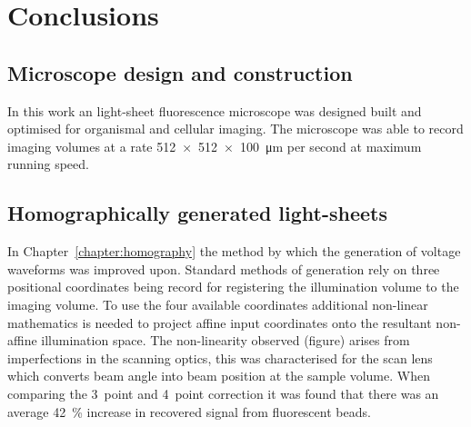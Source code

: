 \ifpdf
    \graphicspath{{Chapters/conclusions/Figs/Raster/}{Chapters/conclusions/Figs/PDF/}{Chapters/conclusions/Figs/}}
\else
    \graphicspath{{Chapters/conclusions/Figs/Vector/}{Chapters/conclusions/Figs/}}
\fi

\chapter{Conclusions}\label{chapter:conclusions}


\section{Microscope design and construction}
In this work an \gls{light-sheet} fluorescence microscope was designed built and optimised for organismal and cellular imaging.
The microscope was able to record imaging volumes at a rate \SI{512x512x100}{\micro\meter} per second at maximum running speed.

\section{Homographically generated light-sheets}
In Chapter~\ref{chapter:homography} the method by which the generation of voltage waveforms was improved upon.
Standard methods of generation rely on three positional coordinates being record for registering the illumination volume to the imaging volume.
To use the four available coordinates additional non-linear mathematics is needed to project affine input coordinates onto the resultant non-affine illumination space.
The non-linearity observed (figure) arises from imperfections in the scanning optics, this was characterised for the scan lens which converts beam angle into beam position at the sample volume.
When comparing the 3~point and 4~point correction it was found that there was an average \SI{42}{\percent} increase in recovered signal from fluorescent beads.

